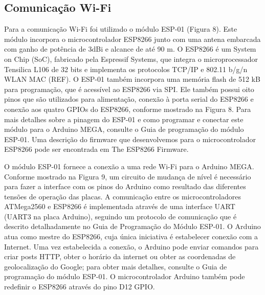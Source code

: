 \subsection{Comunicação Wi-Fi}

Para a comunicação Wi-Fi foi utilizado o módulo ESP-01 (Figura 8). Este módulo incorpora o microcontrolador ESP8266 junto com uma antena embarcada com ganho de potência de 3dBi e alcance de até 90 m. O ESP8266 é um System on Chip (SoC), fabricado pela Espressif Systems, que integra o microprocessador Tensilica L106 de 32 bits e implementa os protocolos TCP/IP e 802.11 b/g/n WLAN MAC (REF). O ESP-01 também incorpora uma memória flash de 512 kB para programação, que é acessível ao ESP8266 via SPI. Ele também possui oito pinos que são utilizados para alimentação, conexão à porta serial do ESP8266 e conexão aos quatro GPIOs do ESP8266, conforme mostrado na Figura 8. Para mais detalhes sobre a pinagem do ESP-01 e como programar e conectar este módulo para o Arduino MEGA, consulte o Guia de programação do módulo ESP-01. Uma descrição do firmware que desenvolvemos para o microcontrolador ESP8266 pode ser encontrada em The ESP8266 Firmware.

O módulo ESP-01 fornece a conexão a uma rede Wi-Fi para o Arduino MEGA. Conforme mostrado na Figura 9, um circuito de mudança de nível é necessário para fazer a interface com os pinos do Arduino como resultado das diferentes tensões de operação das placas. A comunicação entre os microcontroladores ATMega2560 e ESP8266 é implementada através de uma interface UART (UART3 na placa Arduino), seguindo um protocolo de comunicação que é descrito detalhadamente no Guia de Programação do Módulo ESP-01. O Arduino atua como mestre do ESP8266, cuja única iniciativa é estabelecer conexão com a Internet. Uma vez estabelecida a conexão, o Arduino pode enviar comandos para criar posts HTTP, obter o horário da internet ou obter as coordenadas de geolocalização do Google; para obter mais detalhes, consulte o Guia de programação do módulo ESP-01. O microcontrolador Arduino também pode redefinir o ESP8266 através do pino D12 GPIO.